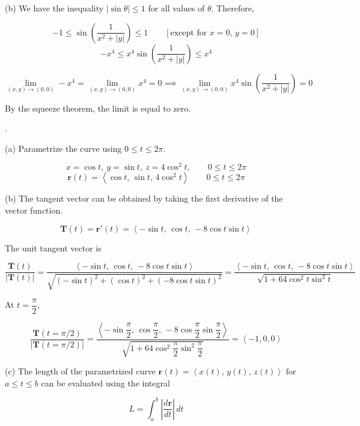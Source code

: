 \documentclass{article}
\begin{document}
\hfill

\noindent (b) We have the inequality $\left|\sin\theta\right|\leq1$ for all values of $\theta$. Therefore,

\[-1\leq\sin\left(\frac1{x^2+|y|}\right)\leq1\qquad\left[\text{except for }x=0,\,y=0\right]\]
\[-x^4\leq x^4\sin\left(\frac1{x^2+|y|}\right)\leq x^4\]

\[\lim_{(x,y)\to(0,0)}-x^4=\lim_{(x,y)\to(0,0)}x^4=0\implies\lim_{(x,y)\to(0,0)}x^4\sin\left(\frac1{x^2+|y|}\right)=\boxed0\]

\hfill

\noindent By the squeeze theorem, the limit is equal to zero.

\newpage

.

\hfill

\noindent (a) Parametrize the curve using $0\leq t\leq 2\pi$.

\[x=\cos t,\:y=\sin t,\:z=4\cos^2t,\qquad0\leq t\leq2\pi\]
\[\boxed{\mathbf r(t)=\left\langle\cos t,\,\sin t,\,4\cos^2t\right\rangle\qquad0\leq t\leq2\pi}\]

\hfill

\noindent (b) The tangent vector can be obtained by taking the first derivative of the vector function.

\[\mathbf T(t)=\mathbf r'(t)=\left\langle-\sin t,\,\cos t,\,-8\cos t\sin t\right\rangle\]

\hfill

\noindent The unit tangent vector is

\[\frac{\mathbf T(t)}{\left|\mathbf T(t)\right|}=\frac{\left\langle-\sin t,\,\cos t,\,-8\cos t\sin t\right\rangle}{\sqrt{(-\sin t)^2+(\cos t)^2+(-8\cos t\sin t)^2}}=\frac{\left\langle-\sin t,\,\cos t,\,-8\cos t\sin t\right\rangle}{\sqrt{1+64\cos^2t\sin^2t}}\]

\hfill

\noindent At $t=\dfrac\pi2$,

\[\frac{\mathbf T(t=\pi/2)}{|\mathbf T(t=\pi/2)|}=\frac{\left\langle-\sin\dfrac\pi2,\,\cos \dfrac\pi2,\,-8\cos\dfrac\pi2\sin\dfrac\pi2\right\rangle}{\sqrt{1+64\cos^2\dfrac\pi2\sin^2\dfrac\pi2}}=\boxed{\left\langle-1,0,0\right\rangle}\]

\hfill

\noindent (c) The length of the parametrized curve $\mathbf{r}(t)=\left\langle x(t),\,y(t),\,z(t)\right\rangle$ for $a\leq t\leq b$ can be evaluated using the integral

\[L=\int_a^b\left|\frac{d\mathbf r}{dt}\right|\,dt\]
\end{document}
